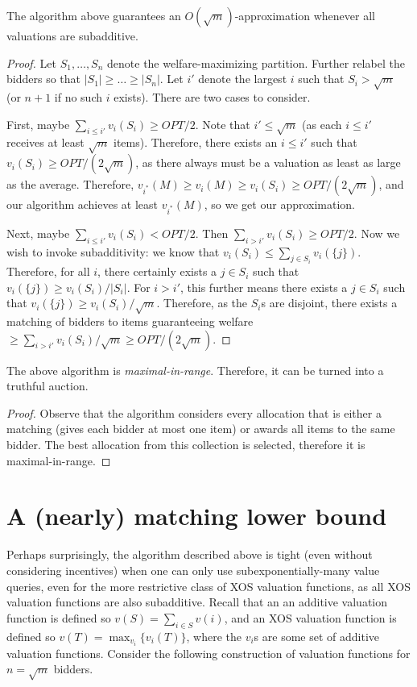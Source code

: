 \begin{theorem} The algorithm above guarantees an $O(\sqrt{m})$-approximation whenever all valuations are subadditive.
\end{theorem}
\begin{proof}
Let $S_1,\ldots, S_n$ denote the welfare-maximizing partition. Further relabel the bidders so that $|S_1|\geq \ldots \geq |S_n|$. Let $i'$ denote the largest $i$ such that $S_i > \sqrt{m}$ (or $n + 1$ if no such $i$ exists). There are two cases to consider.

First, maybe $\sum_{i \leq i'} v_i(S_i) \geq OPT/2$. Note that $i' \leq \sqrt{m}$ (as each $i \leq i'$ receives at least $\sqrt{m}$ items). Therefore, there exists an $i \leq i'$ such that $v_i(S_i) \geq OPT/(2\sqrt{m})$, as there always must be a valuation as least as large as the average. Therefore, $v_{i^*}(M) \geq v_i(M) \geq v_i(S_i) \geq OPT/(2\sqrt{m})$, and our algorithm achieves at least $v_{i^*}(M)$, so we get our approximation.

Next, maybe $\sum_{i \leq i'} v_i(S_i) < OPT/2$. Then $\sum_{i > i'} v_i(S_i) \geq OPT/2$. Now we wish to invoke subadditivity: we know that $v_i(S_i) \leq \sum_{j \in S_i} v_i(\{j\})$. Therefore, for all $i$, there certainly exists a $j \in S_i$ such that $v_i(\{j\}) \geq v_i(S_i)/|S_i|$. For $i > i'$, this further means there exists a $j \in S_i$ such that $v_i(\{j\}) \geq v_i(S_i)/\sqrt{m}$. Therefore, as the $S_i$s are disjoint, there exists a matching of bidders to items guaranteeing welfare $\geq \sum_{i > i'} v_i(S_i)/\sqrt{m} \geq OPT/(2\sqrt{m})$.
\end{proof}

\begin{observation}The above algorithm is \emph{maximal-in-range}. Therefore, it can be turned into a truthful auction.
\end{observation}
\begin{proof}
Observe that the algorithm considers every allocation that is either a matching (gives each bidder at most one item) or awards all items to the same bidder. The best allocation from this collection is selected, therefore it is maximal-in-range.
\end{proof}

\section{A (nearly) matching lower bound}
Perhaps surprisingly, the algorithm described above is tight (even without considering incentives) when one can only use subexponentially-many value queries, even for the more restrictive class of XOS valuation functions, as all XOS valuation functions are also subadditive. Recall that an an additive valuation function is defined so $v(S) = \sum_{i \in S} v(i)$, and an XOS valuation function is defined so $v(T) = \max_{v_i} \{v_i(T)\}$, where the $v_i$s are some set of additive valuation functions. Consider the following construction of valuation functions for $n = \sqrt{m}$ bidders.

